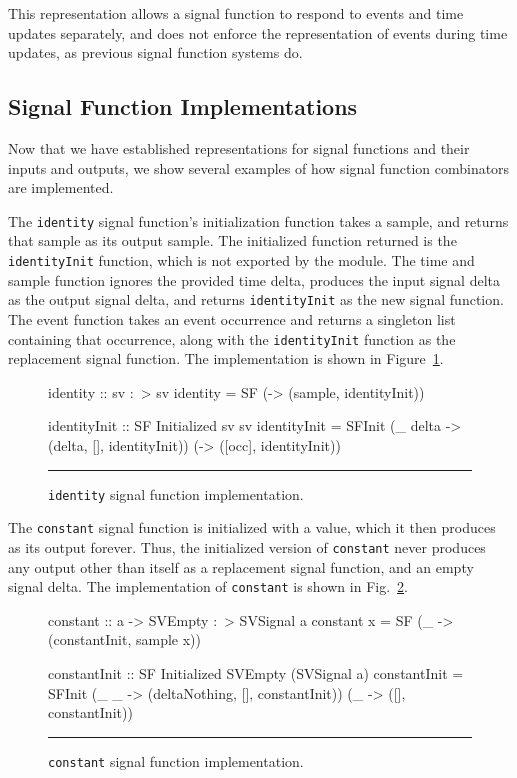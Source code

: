 \documentclass[draft]{llncs}
\begin{document}
This representation allows a signal function to respond to events and time
updates separately, and does not enforce the representation of events during
time updates, as previous signal function systems do.

\subsection{Signal Function Implementations}
\label{subsection:Signal_Function_Implementations}

Now that we have established representations for signal functions and their
inputs and outputs, we show several examples of how signal function combinators
are implemented.

The {\tt identity} signal function's initialization function takes a sample,
and returns that sample as its output sample. The initialized function returned
is the {\tt identityInit} function, which is not exported by the module.
The time and sample function ignores the provided time delta, produces the
input signal delta as the output signal delta, and returns {\tt identityInit} as
the new signal function. The event function takes an event occurrence and
returns a singleton list containing that occurrence, along with the
{\tt identityInit} function as the replacement signal function. The
implementation is shown in Figure~\ref{figure:identity_signal_function_implementation}.

\begin{figure}[t]
\begin{code}
identity :: sv :~> sv
identity = SF (\sample -> (sample, identityInit))

identityInit :: SF Initialized sv sv
identityInit = SFInit (\_ delta -> (delta, [], identityInit))
                      (\occ -> ([occ], identityInit))
\end{code}
\hrule
\caption{{\tt identity} signal function implementation.}
\label{figure:identity_signal_function_implementation}
\end{figure}

The {\tt constant} signal function is initialized with a value, which it then
produces as its output forever. Thus, the initialized version of {\tt constant}
never produces any output other than itself as a replacement
signal function, and an empty signal delta. The implementation of {\tt constant}
is shown in Fig.~\ref{figure:constant_signal_function_implementation}.

\begin{figure}
\begin{code}
constant :: a -> SVEmpty :~> SVSignal a
constant x = SF (\_ -> (constantInit, sample x))

constantInit :: SF Initialized SVEmpty (SVSignal a)
constantInit = SFInit (\_ _ -> (deltaNothing, [], constantInit))
                      (\_ -> ([], constantInit))
\end{code}
\hrule
\caption{{\tt constant} signal function implementation.}
\label{figure:constant_signal_function_implementation}
\end{figure}
\end{document}
